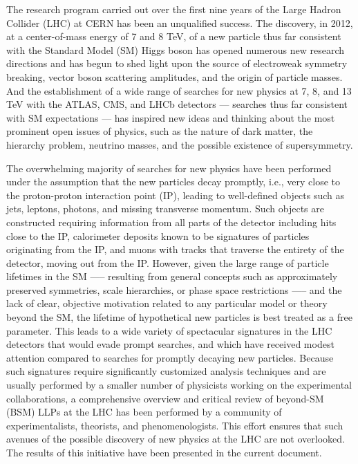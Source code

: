 The research program carried out over the first nine years of the Large Hadron Collider (LHC) at CERN has been an unqualified success.
The discovery, in 2012, at a center-of-mass energy of 7 and 8 TeV, of a new particle thus far consistent with the Standard Model (SM) Higgs boson has opened numerous new research directions and has begun to shed light upon the source of electroweak symmetry breaking, vector boson scattering amplitudes, and the origin of particle masses.
And the establishment of a wide range of searches for new physics at 7, 8, and 13 TeV with the ATLAS, CMS, and LHCb detectors — searches thus far consistent with SM expectations — has inspired new ideas and thinking about the most prominent open issues of physics, such as the nature of dark matter, the hierarchy problem, neutrino masses, and the possible existence of supersymmetry.

The overwhelming majority of searches for new physics have been performed under the assumption that the new particles decay promptly, i.e., very close to the proton-proton interaction point (IP), leading to well-defined objects such as jets, leptons, photons, and missing transverse momentum.
Such objects are constructed requiring information from all parts of the detector including hits close to the IP, calorimeter deposits known to be signatures of particles originating from the IP, and muons with tracks that traverse the entirety of the detector, moving out from the IP.
However, given the large range of particle lifetimes in the SM —-- resulting from general concepts such as approximately preserved symmetries, scale hierarchies, or phase space restrictions —-- and the lack of clear, objective motivation related to any particular model or theory beyond the SM, the lifetime of hypothetical new particles is best treated as a free parameter.
This leads to a wide variety of spectacular signatures in the LHC detectors that would evade prompt searches, and which have received modest attention compared to searches for promptly decaying new particles.
Because such signatures require significantly customized analysis techniques and are usually performed by a smaller number of physicists working on the experimental collaborations, a comprehensive overview and critical review of beyond-SM (BSM) LLPs at the LHC has been performed by a community of experimentalists, theorists, and phenomenologists. This effort ensures that such avenues of the possible discovery of new physics at the LHC are not overlooked.
The results of this initiative have been presented in the current document.

